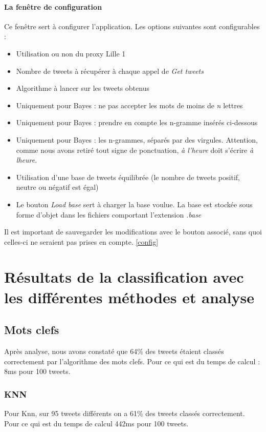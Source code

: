 \documentclass[a4paper,10pt]{report}
\begin{document}
      \subsubsection{La fenêtre de configuration}
	Ce fenêtre sert à configurer l'application. Les options suivantes sont configurables :
	\begin{itemize}
	 \item Utilisation ou non du proxy Lille 1
	 \item Nombre de tweets à récupérer à chaque appel de \textit{Get tweets}
	 \item Algorithme à lancer sur les tweets obtenus
	 \item Uniquement pour Bayes : ne pas accepter les mots de moins de \textit{n} lettres
	 \item Uniquement pour Bayes : prendre en compte les n-gramme insérés ci-dessous
	 \item Uniquement pour Bayes : les n-grammes, séparés par des virgules. Attention, comme nous avons retiré tout signe de ponctuation, \textit{à l'heure} doit s'écrire \textit{à lheure}.
	 \item Utilisation d'une base de tweets équilibrée (le nombre de tweets positif, neutre ou négatif est égal)

	 \item Le bouton \textit{Load base} sert à charger la base voulue. La base est stockée sous forme d'objet dans les fichiers comportant l'extension \textit{.base}
	\end{itemize}
	Il est important de sauvegarder les modifications avec le bouton associé, sans quoi celles-ci ne seraient pas prises en compte.
	\ref{config}
\chapter{Résultats de la classification avec les différentes méthodes et analyse}
    \section{Mots clefs}
      Après analyse, nous avons constaté que 64\% des tweets étaient classés correctement par l'algorithme des mots clefs.
      Pour ce qui est du temps de calcul : 8ms pour 100 tweets. 
    \subsection{KNN}
      Pour Knn, sur 95 tweets différents on a 61\% des tweets classés correctement.
      Pour ce qui est du temps de calcul 442ms pour 100 tweets.
\end{document}
